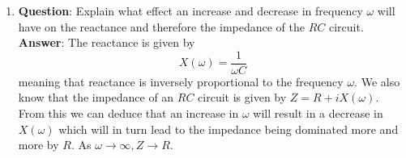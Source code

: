 \documentclass[12pt]{article}
\numberwithin{equation}{section}
\numberwithin{figure}{section}
\begin{document}
\begin{enumerate}
        \item \textbf{Question}: Explain what effect an increase and decrease in frequency $\omega$ will have 
        on the reactance and therefore the impedance of the $RC$ circuit. \newline
        \textbf{Answer}: The reactance is given by 
        \begin{equation*}
            X(\omega)=\frac{1}{\omega C}
        \end{equation*}
        meaning that reactance is inversely proportional to the frequency $\omega$. We also know that 
        the impedance of an $RC$ circuit is given by $Z=R+iX(\omega)$. From this we can deduce that 
        an increase in $\omega$ will result in a decrease in $X(\omega)$ which will in turn lead to 
        the impedance being dominated more and more by $R$. As $\omega\rightarrow\infty, Z\rightarrow R$.
    \end{enumerate}
\end{document}
